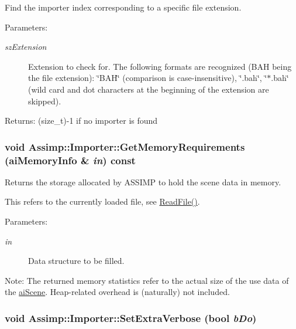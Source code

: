 Find the importer index corresponding to a specific file extension.

\begin{Desc}
\item[Parameters:]
\begin{description}
\item[{\em szExtension}]Extension to check for. The following formats are recognized (BAH being the file extension): \char`\"{}BAH\char`\"{} (comparison is case-insensitive), \char`\"{}.bah\char`\"{}, \char`\"{}$\ast$.bah\char`\"{} (wild card and dot characters at the beginning of the extension are skipped). \end{description}
\end{Desc}
\begin{Desc}
\item[Returns:](size\_\-t)-1 if no importer is found \end{Desc}
\hypertarget{class_assimp_1_1_importer_ba2eacd0b627cb481b6d66d9ca55eac9}{
\subsubsection[GetMemoryRequirements]{\setlength{\rightskip}{0pt plus 5cm}void Assimp::Importer::GetMemoryRequirements ({\bf aiMemoryInfo} \& {\em in}) const}}
\label{class_assimp_1_1_importer_ba2eacd0b627cb481b6d66d9ca55eac9}


Returns the storage allocated by ASSIMP to hold the scene data in memory.

This refers to the currently loaded file, see \hyperlink{class_assimp_1_1_importer_174418ab41d5b8bc51a044895cb991e5}{ReadFile()}. \begin{Desc}
\item[Parameters:]
\begin{description}
\item[{\em in}]Data structure to be filled. \end{description}
\end{Desc}
\begin{Desc}
\item[Note:]The returned memory statistics refer to the actual size of the use data of the \hyperlink{structai_scene}{aiScene}. Heap-related overhead is (naturally) not included. \end{Desc}
\hypertarget{class_assimp_1_1_importer_9bb793072c84c784279d0f6e870bb42d}{
\subsubsection[SetExtraVerbose]{\setlength{\rightskip}{0pt plus 5cm}void Assimp::Importer::SetExtraVerbose (bool {\em bDo})}}
\label{class_assimp_1_1_importer_9bb793072c84c784279d0f6e870bb42d}


